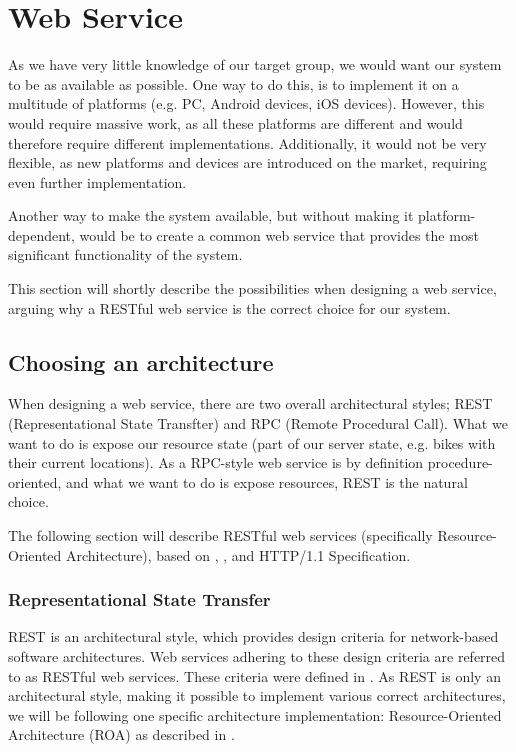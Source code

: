 \section{Web Service}
As we have very little knowledge of our target group, we would want our system to be as available as possible.
One way to do this, is to implement it on a multitude of platforms (e.g. PC, Android devices, iOS devices).
However, this would require massive work, as all these platforms are different and would therefore require different implementations.
Additionally, it would not be very flexible, as new platforms and devices are introduced on the market, requiring even further implementation.

Another way to make the system available, but without making it platform-dependent, would be to create a common web service that provides the most significant functionality of the system.

This section will shortly describe the possibilities when designing a web service, arguing why a RESTful web service is the correct choice for our system.

\subsection{Choosing an architecture}
When designing a web service, there are two overall architectural styles; REST (Representational State Transfter) and RPC (Remote Procedural Call).\cite{restful_web_services}
What we want to do is expose our resource state (part of our server state, e.g. bikes with their current locations).
As a RPC-style web service is by definition procedure-oriented, and what we want to do is expose resources, REST is the natural choice.

The following section will describe RESTful web services (specifically Resource-Oriented Architecture), based on \citet{restful_web_services}, \citet{fielding_dissertation}, and HTTP/1.1 Specification\cite{http_specification}.

\subsubsection{Representational State Transfer}
REST is an architectural style, which provides design criteria for network-based software architectures.
Web services adhering to these design criteria are referred to as RESTful web services.
These criteria were defined in \citet{fielding_dissertation}.
As REST is only an architectural style, making it possible to implement various correct architectures, we will be following one specific architecture implementation: Resource-Oriented Architecture (ROA) as described in \citet{restful_web_services}.

